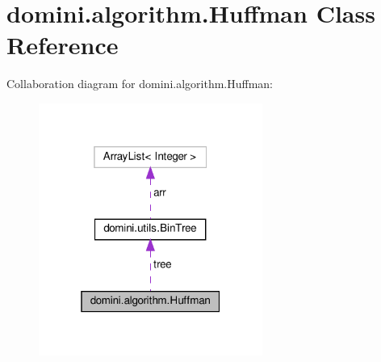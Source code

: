 \hypertarget{classdomini_1_1algorithm_1_1Huffman}{}\section{domini.\+algorithm.\+Huffman Class Reference}
\label{classdomini_1_1algorithm_1_1Huffman}


Collaboration diagram for domini.\+algorithm.\+Huffman\+:\nopagebreak
\begin{figure}[H]
\begin{center}
\leavevmode
\includegraphics[width=208pt]{classdomini_1_1algorithm_1_1Huffman__coll__graph}
\end{center}
\end{figure}
